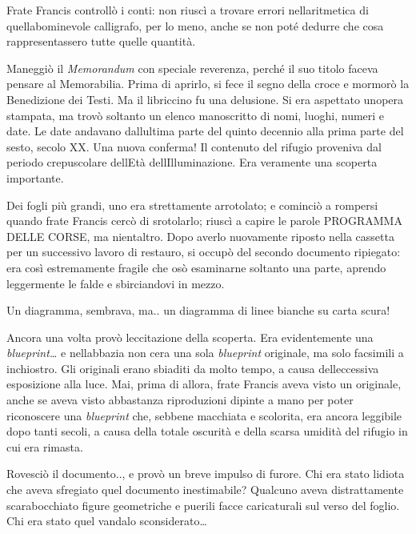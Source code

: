 Frate Francis controllò i conti: non riuscì a trovare errori
nell\textquotesingle aritmetica di quell\textquotesingle abominevole
calligrafo, per lo meno, anche se non poté dedurre che cosa
rappresentassero tutte quelle quantità.

Maneggiò il \emph{Memorandum} con speciale reverenza, perché il suo
titolo faceva pensare al Memorabilia. Prima di aprirlo, si fece il segno
della croce e mormorò la Benedizione dei Testi. Ma il libriccino fu una
delusione. Si era aspettato un\textquotesingle opera stampata, ma trovò
soltanto un elenco manoscritto di nomi, luoghi, numeri e date. Le date
andavano dall\textquotesingle ultima parte del quinto decennio alla
prima parte del sesto, secolo XX. Una nuova conferma! Il contenuto del
rifugio proveniva dal periodo crepuscolare dell\textquotesingle Età
dell\textquotesingle Illuminazione. Era veramente una scoperta
importante.

Dei fogli più grandi, uno era strettamente arrotolato; e cominciò a
rompersi quando frate Francis cercò di srotolarlo; riuscì a capire le
parole PROGRAMMA DELLE CORSE, ma nient\textquotesingle altro. Dopo
averlo nuovamente riposto nella cassetta per un successivo lavoro di
restauro, si occupò del secondo documento ripiegato: era così
estremamente fragile che osò esaminarne soltanto una parte, aprendo
leggermente le falde e sbirciandovi in mezzo.

Un diagramma, sembrava, ma.. un diagramma di linee bianche su carta
scura!

Ancora una volta provò l\textquotesingle eccitazione della scoperta. Era
evidentemente una \emph{blueprint\ldots{}} e
nell\textquotesingle abbazia non c\textquotesingle era una sola
\emph{blueprint} originale, ma solo facsimili a inchiostro. Gli
originali erano sbiaditi da molto tempo, a causa
dell\textquotesingle eccessiva esposizione alla luce. Mai, prima di
allora, frate Francis aveva visto un originale, anche se aveva visto
abbastanza riproduzioni dipinte a mano per poter riconoscere una
\emph{blueprint} che, sebbene macchiata e scolorita, era ancora
leggibile dopo tanti secoli, a causa della totale oscurità e della
scarsa umidità del rifugio in cui era rimasta.

Rovesciò il documento.., e provò un breve impulso di furore. Chi era
stato l\textquotesingle idiota che aveva sfregiato quel documento
inestimabile? Qualcuno aveva distrattamente scarabocchiato figure
geometriche e puerili facce caricaturali sul verso del foglio. Chi era
stato quel vandalo sconsiderato\ldots{}

